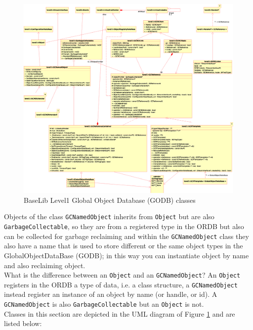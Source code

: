 \begin{figure}[h!]
 \begin{center}
\includegraphics[width=1.1\textwidth]{level1/level1-GC.eps}
  \caption{BaseLib Level1 Global Object Database (GODB) classes}
  \label{f:level1:GC}
 \end{center}
\end{figure}

Objects of the class \texttt{GCNamedObject} inherits from \texttt{Object} but are also \texttt{GarbageCollectable}, so they are from a registered type in the ORDB but also can be collected for garbage reclaiming and within the \texttt{GCNamedObject} class they also have a name that is used to store different or the same object types in the GlobalObjectDataBase (GODB); in this way you can instantiate object by name and also reclaiming object.\\

What is the difference between an \texttt{Object} and an \texttt{GCNamedObject}? An \texttt{Object} registers in the ORDB a type of data, i.e. a class structure, a \texttt{GCNamedObject} instead register an instance of an object by name (or handle, or id). A \texttt{GCNamedObject} is also \texttt{GarbageCollectable} but an \texttt{Object} is not.\\

Classes in this section are depicted in the UML diagram of Figure \ref{f:level1:GC} and are listed below:

